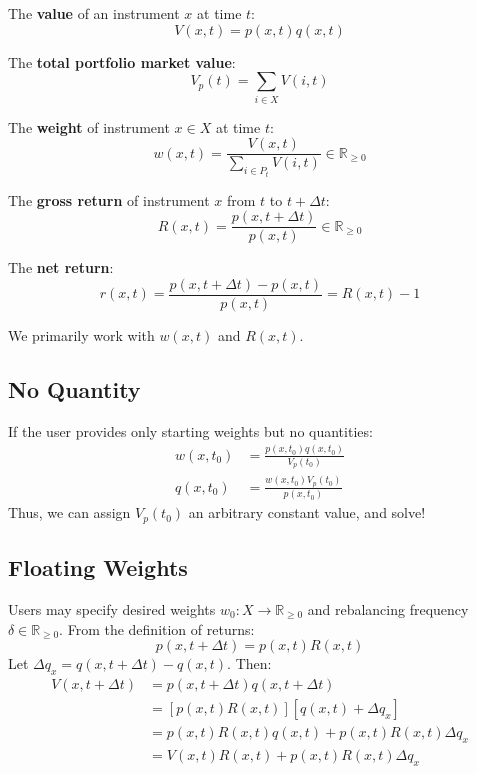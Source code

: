 \documentclass[12pt]{article}
\begin{document}
The \textbf{value} of an instrument $ x $ at time $ t $:
\begin{equation}
V(x,t) = p(x,t) q(x,t)
\label{eq:instrument_value}
\end{equation}

The \textbf{total portfolio market value}:
\begin{equation}
V_p(t) = \sum_{i \in X} V(i,t)
\label{eq:portfolio_value}
\end{equation}

The \textbf{weight} of instrument $ x \in X $ at time $ t $:
\begin{equation}
w(x,t) = \frac{V(x,t)}{\sum_{i \in P_t} V(i,t)} \in \mathbb{R}_{\geq 0}
\label{eq:weight}
\end{equation}

The \textbf{gross return} of instrument $ x $ from $ t $ to $ t + \Delta t $:
\begin{equation}
R(x,t) = \frac{p(x,t + \Delta t)}{p(x, t)} \in \mathbb{R}_{\geq 0}
\label{eq:gross_return}
\end{equation}

The \textbf{net return}:
\begin{equation}
r(x,t) = \frac{p(x,t + \Delta t) - p(x,t)}{p(x, t)} = R(x,t) - 1
\label{eq:net_return}
\end{equation}

We primarily work with $ w(x,t) $ and $ R(x,t) $.

\subsection{No Quantity}
If the user provides only starting weights but no quantities:
\begin{align}
w(x, t_0) &= \frac{p(x, t_0)q(x, t_0)}{V_p(t_0)} \\
q(x, t_0) &= \frac{w(x,t_0)  V_p(t_0)}{p(x, t_0)} 
\end{align}
Thus, we can assign $ V_p(t_0) $ an arbitrary constant value, and solve!

\subsection{Floating Weights}
Users may specify desired weights $ w_0 : X \to \mathbb{R}_{\geq 0} $ and rebalancing frequency $ \delta \in \mathbb{R}_{\geq 0} $.  
From the definition of returns:
\begin{equation}
p(x, t + \Delta t) = p(x,t)R(x,t)
\label{eq:price_evolution}
\end{equation}
Let $ \Delta q_x = q(x, t + \Delta t) - q(x,t) $. Then:
\begin{align}
V(x,t + \Delta t)
&= p(x,t + \Delta t)q(x,t + \Delta t) \nonumber\\
&= [p(x,t)R(x,t)][q(x,t) + \Delta q_x] \nonumber\\
&= p(x,t)R(x,t)q(x,t) + p(x,t)R(x,t)\Delta q_x \nonumber\\
&= V(x,t)R(x,t) + p(x,t)R(x,t)\Delta q_x
\label{eq:value_evolution}
\end{align}
\end{document}
